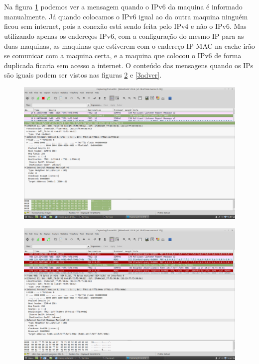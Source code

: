 \documentclass[12pt]{article}
\begin{document}
\section{}
Na figura \ref{3.1} podemos ver a mensagem quando o IPv6 da maquina é informado manualmente. Já quando colocamos o IPv6 igual ao da outra maquina ninguém ficou sem internet, pois a conexão está sendo feita pelo IPv4 e não o IPv6. Mas utilizando apenas os endereços IPv6, com a configuração do mesmo IP para as duas maquinas, as maquinas que estiverem com o endereço IP-MAC na cache irão se comunicar com a maquina certa, e a maquina que colocou o IPv6 de forma duplicada ficaria sem acesso a internet. O conteúdo das mensagens quando os IPs são iguais podem ser vistos nas figuras \ref{3soli} e \ref{3adver}.
\begin{figure}[ht]
\centering
\includegraphics[scale=0.25]{teste1.png}
\caption{}
\label{3.1}
\end{figure}
\begin{figure}[ht]
\centering
\includegraphics[scale=0.25]{neighborsolicitation3quandomatheuspegoumeuip.png}
\caption{}
\label{3soli}
\end{figure}
\end{document}
